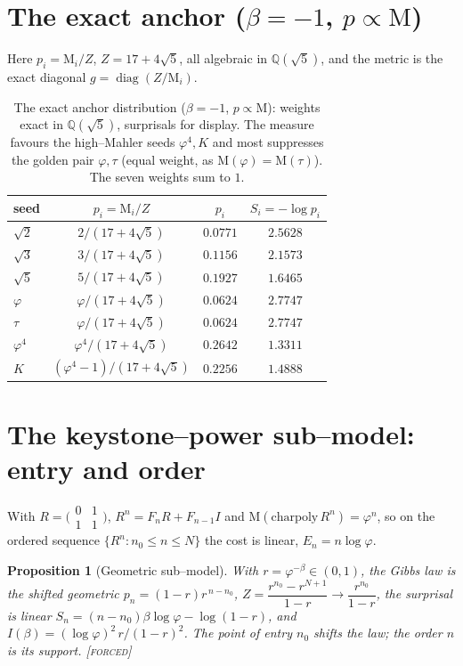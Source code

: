 \documentclass[11pt]{article}
\newtheorem{proposition}[theorem]{Proposition}
\theoremstyle{definition}
\newcommand{\ph}{\varphi}
\newcommand{\Q}{\mathbb{Q}}
\newcommand{\Mah}{\mathrm{M}}
\newcommand{\forcedtag}{{\scshape [forced]}}
\begin{document}
\section{The exact anchor ($\beta=-1$, $p\propto\Mah$)}
Here $p_i=\Mah_i/Z$, $Z=17+4\sqrt5$, all algebraic in $\Q(\sqrt5)$, and the metric is the exact
diagonal $g=\operatorname{diag}(Z/\Mah_i)$.
\begin{table}[h]\centering
\begin{tabular}{lccc}
\toprule
seed & $p_i=\Mah_i/Z$ & $p_i$ & $S_i=-\log p_i$\\ \midrule
$\sqrt2$ & $2/(17+4\sqrt5)$ & $0.0771$ & $2.5628$\\
$\sqrt3$ & $3/(17+4\sqrt5)$ & $0.1156$ & $2.1573$\\
$\sqrt5$ & $5/(17+4\sqrt5)$ & $0.1927$ & $1.6465$\\
$\ph$ & $\ph/(17+4\sqrt5)$ & $0.0624$ & $2.7747$\\
$\tau$ & $\ph/(17+4\sqrt5)$ & $0.0624$ & $2.7747$\\
$\ph^4$ & $\ph^4/(17+4\sqrt5)$ & $0.2642$ & $1.3311$\\
$K$ & $(\ph^4-1)/(17+4\sqrt5)$ & $0.2256$ & $1.4888$\\
\bottomrule
\end{tabular}
\caption{The exact anchor distribution ($\beta=-1$, $p\propto\Mah$): weights exact in $\Q(\sqrt5)$,
surprisals for display. The measure favours the high--Mahler seeds $\ph^4,K$ and most suppresses the
golden pair $\ph,\tau$ (equal weight, as $\Mah(\ph)=\Mah(\tau)$). The seven weights sum to $1$.}
\label{tab:anchor}
\end{table}

\section{The keystone--power sub--model: entry and order}
With $R=\bigl(\begin{smallmatrix}0&1\\1&1\end{smallmatrix}\bigr)$, $R^n=F_nR+F_{n-1}I$ and
$\Mah(\mathrm{charpoly}\,R^n)=\ph^n$, so on the ordered sequence $\{R^n:n_0\le n\le N\}$ the cost is
linear, $E_n=n\log\ph$.
\begin{proposition}[Geometric sub--model]\label{prop:geo}
With $r=\ph^{-\beta}\in(0,1)$, the Gibbs law is the shifted geometric $p_n=(1-r)r^{\,n-n_0}$,
$Z=\dfrac{r^{n_0}-r^{N+1}}{1-r}\to\dfrac{r^{n_0}}{1-r}$, the surprisal is linear
$S_n=(n-n_0)\beta\log\ph-\log(1-r)$, and $I(\beta)=(\log\ph)^2\,r/(1-r)^2$. The point of entry $n_0$
shifts the law; the order $n$ is its support. \forcedtag
\end{proposition}
\end{document}
